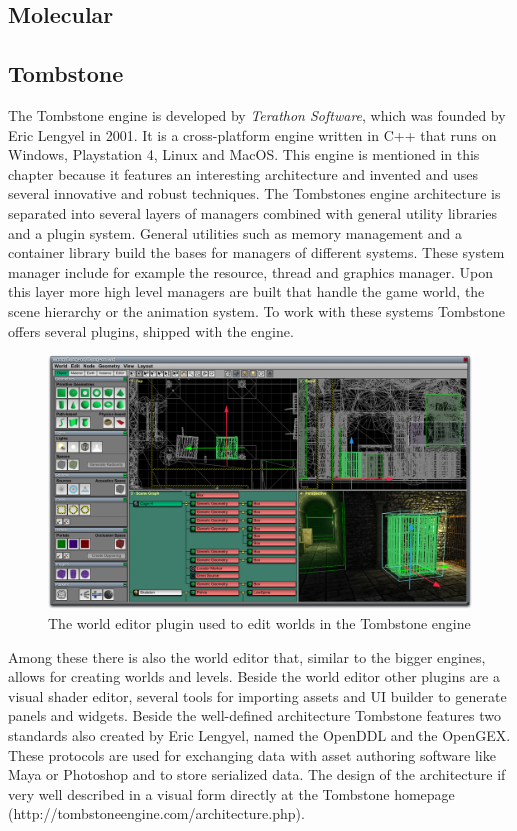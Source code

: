 \subsection{Molecular} \label{molecule}
\blindtext

\subsection{Tombstone}

The Tombstone engine is developed by \textit{Terathon Software}, which was founded by Eric Lengyel in 2001. It is a cross-platform engine written in C++ that runs on Windows, Playstation 4, Linux and MacOS. This engine is mentioned in this chapter because it features an interesting architecture and invented and uses several innovative and robust techniques.
The Tombstones engine architecture is separated into several layers of managers combined with general utility libraries and a plugin system. General utilities such as memory management and a container library build the bases for managers of different systems. These system manager include for example the resource, thread and graphics manager. Upon this layer more high level managers are built that handle the game world, the scene hierarchy or the animation system. To work with these systems Tombstone offers several plugins, shipped with the engine.

 \begin{figure}[h!]
 	\centering \includegraphics[width=0.5 \linewidth]{PICs/tombstone_ed.png}
 	\caption{The world editor plugin used to edit worlds in the Tombstone engine}
 	\label{fig:tombstone_ed}
 \end{figure}

Among these there is also the world editor that, similar to the bigger engines, allows for creating worlds and levels. Beside the world editor other plugins are a visual shader editor, several tools for importing assets and \ac{UI} builder to generate panels and widgets. Beside the well-defined architecture Tombstone features two standards also created by Eric Lengyel, named the \ac{OpenDDL} and the \ac{OpenGEX}. These protocols are used for exchanging data with asset authoring software like Maya or Photoshop and to store serialized data. The design of the architecture if very well described in a visual form directly at the Tombstone homepage (http://tombstoneengine.com/architecture.php).

